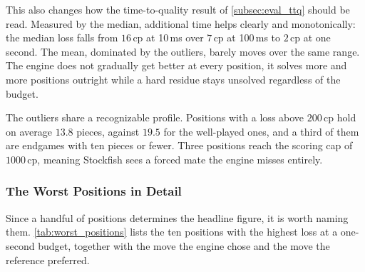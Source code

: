 This also changes how the time-to-quality result of \cref{subsec:eval_ttq} should
be read. Measured by the median, additional time helps clearly and monotonically:
the median loss falls from $16$\,cp at 10\,ms over $7$\,cp at 100\,ms to $2$\,cp
at one second. The mean, dominated by the outliers, barely moves over the same
range. The engine does not gradually get better at every position, it solves more
and more positions outright while a hard residue stays unsolved regardless of the
budget.

The outliers share a recognizable profile. Positions with a loss above $200$\,cp
hold on average $13.8$ pieces, against $19.5$ for the well-played ones, and a
third of them are endgames with ten pieces or fewer. Three positions reach the
scoring cap of $1000$\,cp, meaning Stockfish sees a forced mate the engine misses
entirely.

\subsubsection{The Worst Positions in Detail}
\label{subsubsec:eval_case_studies}

Since a handful of positions determines the headline figure, it is worth naming
them. \cref{tab:worst_positions} lists the ten positions with the highest loss at
a one-second budget, together with the move the engine chose and the move the
reference preferred.

